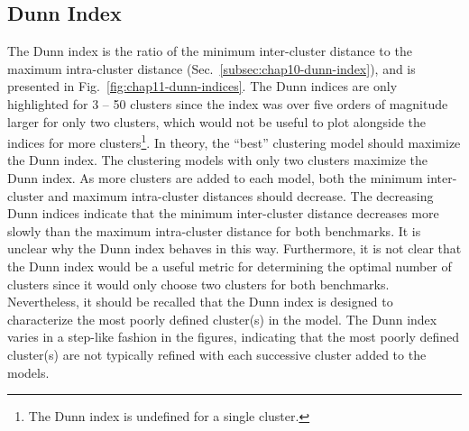 \clearpage

\subsection{Dunn Index}
\label{subsec:chap11-dunn-index}

The Dunn index is the ratio of the minimum inter-cluster distance to the maximum intra-cluster distance (Sec.~\ref{subsec:chap10-dunn-index}), and is presented in Fig.~\ref{fig:chap11-dunn-indices}. The Dunn indices are only highlighted for 3 -- 50 clusters since the index was over five orders of magnitude larger for only two clusters, which would not be useful to plot alongside the indices for more clusters\footnote{The Dunn index is undefined for a single cluster.}. In theory, the ``best'' clustering model should maximize the Dunn index. The clustering models with only two clusters maximize the Dunn index. As more clusters are added to each model, both the minimum inter-cluster and maximum intra-cluster distances should decrease. The decreasing Dunn indices indicate that the minimum inter-cluster distance decreases more slowly than the maximum intra-cluster distance for both benchmarks. It is unclear why the Dunn index behaves in this way. Furthermore, it is not clear that the Dunn index would be a useful metric for determining the optimal number of clusters since it would only choose two clusters for both benchmarks. Nevertheless, it should be recalled that the Dunn index is designed to characterize the most poorly defined cluster(s) in the model. The Dunn index varies in a step-like fashion in the figures, indicating that the most poorly defined cluster(s) are not typically refined with each successive cluster added to the models.

